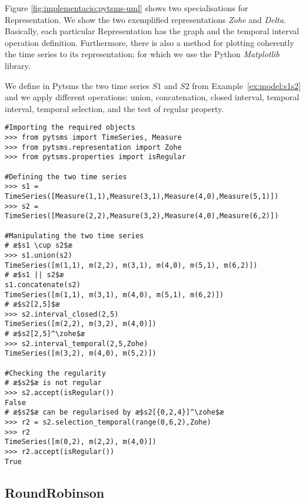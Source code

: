 Figure \ref{fig:implementacio:pytsms-uml} shows two specialisations
for Representation. We show the two exemplified representations
\emph{Zohe} and \emph{Delta}. Basically, each particular
Representation has the graph and the temporal interval operation
definition. Furthermore, there is also a method for plotting
coherently the time series to its representation; for which we use the
Python \emph{Matplotlib} library.



\begin{example}
  We define in Pytsms the two time series $S1$ and $S2$ from
  Example~\ref{ex:model:s1s2} and we apply different operations:
  union, concatenation, closed interval, \zohe{} temporal interval,
  \zohe{} temporal selection, and the test of regular property.
\begin{lstlisting}[style=py]
#Importing the required objects
>>> from pytsms import TimeSeries, Measure
>>> from pytsms.representation import Zohe
>>> from pytsms.properties import isRegular

#Defining the two time series
>>> s1 = TimeSeries([Measure(1,1),Measure(3,1),Measure(4,0),Measure(5,1)])
>>> s2 = TimeSeries([Measure(2,2),Measure(3,2),Measure(4,0),Measure(6,2)])

#Manipulating the two time series
# æ$s1 \cup s2$æ
>>> s1.union(s2)
TimeSeries([m(1,1), m(2,2), m(3,1), m(4,0), m(5,1), m(6,2)])
# æ$s1 || s2$æ
s1.concatenate(s2) 
TimeSeries([m(1,1), m(3,1), m(4,0), m(5,1), m(6,2)])
# æ$s2[2,5]$æ
>>> s2.interval_closed(2,5)
TimeSeries([m(2,2), m(3,2), m(4,0)])
# æ$s2[2,5]^\zohe$æ
>>> s2.interval_temporal(2,5,Zohe)
TimeSeries([m(3,2), m(4,0), m(5,2)])

#Checking the regularity
# æ$s2$æ is not regular
>>> s2.accept(isRegular())
False
# æ$s2$æ can be regularised by æ$s2[{0,2,4}]^\zohe$æ
>>> r2 = s2.selection_temporal(range(0,6,2),Zohe)
>>> r2
TimeSeries([m(0,2), m(2,2), m(4,0)])
>>> r2.accept(isRegular())
True
\end{lstlisting}
\end{example}





\subsection{RoundRobinson}


